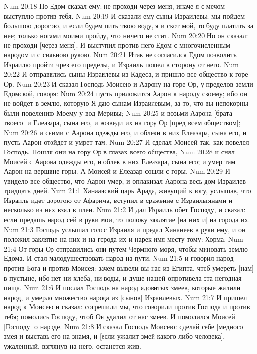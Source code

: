 \vs Num 20:18 Но Едом сказал ему: не проходи через меня, иначе я с мечом выступлю против тебя.
\vs Num 20:19 И сказали ему сыны Израилевы: мы пойдем большою дорогою, и если будем пить твою воду, я и скот мой, то буду платить за нее; только ногами моими пройду, что ничего не стит.
\vs Num 20:20 Но он сказал: не проходи [через меня]. И выступил против него Едом с многочисленным народом и с сильною рукою.
\vs Num 20:21 Итак не согласился Едом позволить Израилю пройти чрез его пределы, и Израиль пошел в сторону от него.
\vs Num 20:22 И отправились сыны Израилевы из Кадеса, и пришло все общество к горе Ор.
\rsbpar\vs Num 20:23 И сказал Господь Моисею и Аарону на горе Ор, у пределов земли Едомской, говоря:
\vs Num 20:24 пусть приложится Аарон к народу своему; ибо он не войдет в землю, которую Я даю сынам Израилевым, за то, что вы непокорны были повелению Моему у вод Меривы;
\vs Num 20:25 и возьми Аарона [брата твоего] и Елеазара, сына его, и возведи их на гору Ор [пред всем обществом];
\vs Num 20:26 и сними с Аарона одежды его, и облеки в них Елеазара, сына его, и пусть Аарон отойдет и умрет там.
\vs Num 20:27 И сделал Моисей так, как повелел Господь. Пошли они на гору Ор в глазах всего общества,
\vs Num 20:28 и снял Моисей с Аарона одежды его, и облек в них Елеазара, сына его; и умер там Аарон на вершине горы. А Моисей и Елеазар сошли с горы.
\vs Num 20:29 И увидело все общество, что Аарон умер, и оплакивал Аарона весь дом Израилев тридцать дней.
\vs Num 21:1 Ханаанский царь Арада, живущий к югу, услышав, что Израиль идет дорогою от Афарима, вступил в сражение с Израильтянами и несколько из них взял в плен.
\vs Num 21:2 И дал Израиль обет Господу, и сказал: если предашь народ сей в руки мои, то положу заклятие [на них и] на города их.
\vs Num 21:3 Господь услышал голос Израиля и предал Хананеев в руки ему, и он положил заклятие на них и на города их и нарек имя месту тому: Хорма.
\rsbpar\vs Num 21:4 От горы Ор отправились они путем Чермного моря, чтобы миновать землю Едома. И стал малодушествовать народ на пути,
\vs Num 21:5 и говорил народ против Бога и против Моисея: зачем вывели вы нас из Египта, чтоб умереть [нам] в пустыне, ибо  нет ни хлеба, ни воды, и душе нашей опротивела эта негодная пища.
\vs Num 21:6 И послал Господь на народ ядовитых змеев, которые жалили народ, и умерло множество народа из [сынов] Израилевых.
\vs Num 21:7 И пришел народ к Моисею и сказал: согрешили мы, что говорили против Господа и против тебя; помолись Господу, чтоб Он удалил от нас змеев. И помолился Моисей [Господу] о народе.
\rsbpar\vs Num 21:8 И сказал Господь Моисею: сделай себе [медного] змея и выставь его на знамя, и [если ужалит змей какого-либо человека], ужаленный, взглянув на него, останется жив.
